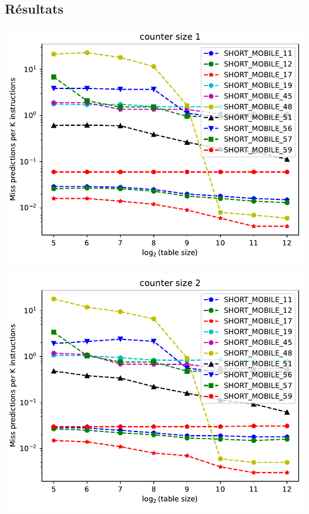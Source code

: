 \documentclass[a4paper]{article}
\begin{document}
\subsection{Résultats}
\begin{minipage}{.48\linewidth}
\includegraphics[width=\linewidth]{gshare/graph_1}
\end{minipage}%
\hfill
\begin{minipage}{.48\linewidth}
\includegraphics[width=\linewidth]{gshare/graph_2}
\end{minipage}
\end{document}
